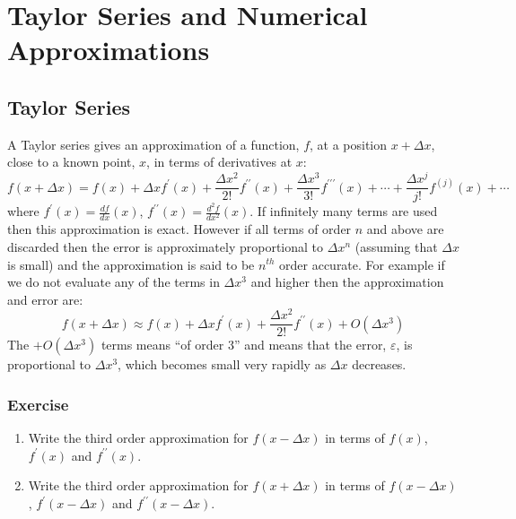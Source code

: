 \chapter{Taylor Series and Numerical Approximations}

\section{Taylor Series}

A Taylor series gives an approximation of a function, $f$, at a position $x+\Delta x$, close to a known point, $x$, in terms of derivatives at $x$:
\begin{equation}
f(x+\Delta x) = f(x) + \Delta x f^\prime(x) + \frac{\Delta x^2}{2!} f^{\prime\prime}(x) + \frac{\Delta x^3}{3!} f^{\prime\prime\prime}(x) + \cdots
+ \frac{\Delta x^j}{j!} f^{(j)}(x) + \cdots
\label{eqn:Taylor}
\end{equation}
where $f^\prime(x) = \frac{df}{dx}(x)$, $f^{\prime\prime}(x) = \frac{d^2f}{dx^2}(x)$. If infinitely many terms are used then this approximation is exact. However if all terms of order $n$ and above are discarded then the error is approximately proportional to $\Delta x^n$ (assuming that $\Delta x$ is small) and the approximation is said to be $n^{th}$ order accurate. For example if we do not evaluate any of the terms in $\Delta x^3$ and higher then the approximation and error are:
\begin{equation}
f(x+\Delta x) \approx f(x) + \Delta x f^\prime(x) + \frac{\Delta x^2}{2!} f^{\prime\prime}(x) + O(\Delta x^3)
\label{eqn:Taylor3}
\end{equation}
The $+ O(\Delta x^3)$ terms means ``of order 3'' and means that the error, $\varepsilon$, is proportional to $\Delta x^3$, which becomes small very rapidly as $\Delta x$ decreases. 

\subsection{Exercise}

\begin{enumerate}
\item Write the third order approximation for $f(x-\Delta x)$ in terms of $f(x)$, $f^\prime(x)$ and $f^{\prime\prime}(x)$.

\item Write the third order approximation for $f(x+\Delta x)$ in terms of $f(x-\Delta x)$, $f^\prime(x-\Delta x)$ and $f^{\prime\prime}(x-\Delta x)$.
\end{enumerate}

